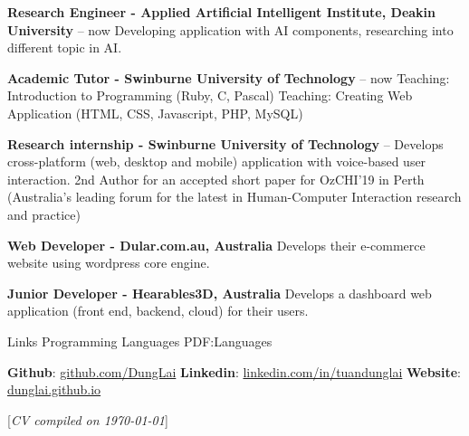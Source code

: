 \documentclass[letterpaper,MMMyyyy,nonstopmode]{simpleresumecv}
\newcommand{\CVNote}{CV compiled on {\today}}
\begin{document}
\begin{Body}
\BulletItem
\textbf{Research Engineer - Applied Artificial Intelligent Institute, Deakin University}
\hfill
{} -- now
\SubBulletItem Developing application with AI components, researching into different topic in AI.

\BulletItem
\textbf{Academic Tutor - Swinburne University of Technology}
\hfill
{} -- now
\SubBulletItem Teaching: Introduction to Programming (Ruby, C, Pascal)
\SubBulletItem Teaching: Creating Web Application (HTML, CSS, Javascript, PHP, MySQL)

\BulletItem
\textbf{Research internship - Swinburne University of Technology}
\hfill
{} --
\SubBulletItem Develops cross-platform (web, desktop and mobile) application with voice-based user interaction.
\SubBulletItem 2nd Author for an accepted short paper for OzCHI’19 in Perth (Australia's leading forum for the latest in Human-Computer Interaction research and practice)

\BulletItem
\textbf{Web Developer - Dular.com.au, Australia}
\hfill
\SubBulletItem Develops their e-commerce website using wordpress core engine.

\BulletItem
\textbf{Junior Developer - Hearables3D, Australia}
\hfill
\SubBulletItem Develops a dashboard web application (front end, backend, cloud) for their users.

\Section
{Links}
{Programming Languages}
{PDF:Languages}

\BulletItem \textbf{Github}: \href{https://github.com/DungLai}{\color{blue}github.com/DungLai}
\BulletItem \textbf{Linkedin}: \href{https://www.linkedin.com/in/tuandunglai/}{\color{blue}linkedin.com/in/tuandunglai}
\BulletItem \textbf{Website}: \href{https://dunglai.github.io/}{\color{blue}dunglai.github.io}


\end{Body}



\BigGap
\UseNoteFont%
\null\hfill%
[\textit{\CVNote}]
\end{document}
